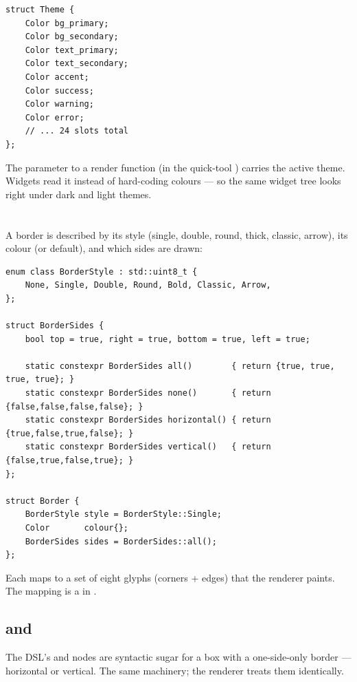 \begin{lstlisting}
struct Theme {
    Color bg_primary;
    Color bg_secondary;
    Color text_primary;
    Color text_secondary;
    Color accent;
    Color success;
    Color warning;
    Color error;
    // ... 24 slots total
};
\end{lstlisting}

The  parameter to a render function (in the quick-tool
) carries the active theme. Widgets read it instead of
hard-coding colours --- so the same widget tree looks right under
dark and light themes.

\section{}

A border is described by its style (single, double, round, thick,
classic, arrow), its colour (or default), and which sides are drawn:

\begin{lstlisting}
enum class BorderStyle : std::uint8_t {
    None, Single, Double, Round, Bold, Classic, Arrow,
};

struct BorderSides {
    bool top = true, right = true, bottom = true, left = true;

    static constexpr BorderSides all()        { return {true, true, true, true}; }
    static constexpr BorderSides none()       { return {false,false,false,false}; }
    static constexpr BorderSides horizontal() { return {true,false,true,false}; }
    static constexpr BorderSides vertical()   { return {false,true,false,true}; }
};

struct Border {
    BorderStyle style = BorderStyle::Single;
    Color       colour{};
    BorderSides sides = BorderSides::all();
};
\end{lstlisting}

Each  maps to a set of eight glyphs (corners + edges)
that the renderer paints. The mapping is a 
 in .

\subsection{ and }

The DSL's  and  nodes are syntactic sugar for a
box with a one-side-only border --- horizontal or vertical. The same
machinery; the renderer treats them identically.

